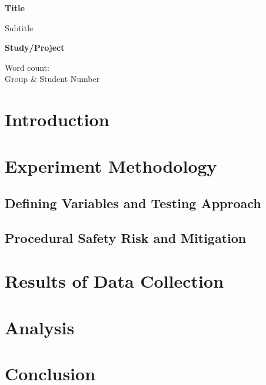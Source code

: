 \documentclass[a4paper,12pt]{extarticle}
\begin{document}
\begin{titlepage}
    \begin{center}
        \vspace*{1cm}
            
        \Huge
        \textbf{Title}
            
        \vspace{1cm}
        \LARGE
        Subtitle
        \vspace{4cm}
            
        \textbf{Study/Project}
            
        \vfill
        
        \Large
        Word count:\\
        Group \& Student Number\\
    \end{center}
\end{titlepage}

\tableofcontents
\newpage

\section{Introduction}

\section{Experiment Methodology}

\subsection{Defining Variables and Testing Approach}

\subsection{Procedural Safety Risk and Mitigation}

\section{Results of Data Collection}

\section{Analysis}

\section{Conclusion}
\end{document}
